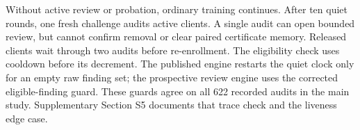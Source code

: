 \documentclass[journal]{IEEEtran}
\begin{document}
Without active review or probation, ordinary training continues. After
ten quiet rounds, one fresh challenge audits active clients. A single
audit can open bounded review, but cannot confirm removal or clear
paired certificate memory. Released clients wait through two audits
before re-enrollment. The eligibility check uses cooldown before its
decrement. The published engine restarts the quiet clock only for an
empty raw finding set; the prospective review engine uses the corrected
eligible-finding guard. These guards agree on all 622 recorded audits
in the main study. Supplementary Section S5 documents that trace check
and the liveness edge case.

\begin{figure}[t]
\centering

\end{figure}
\end{document}
